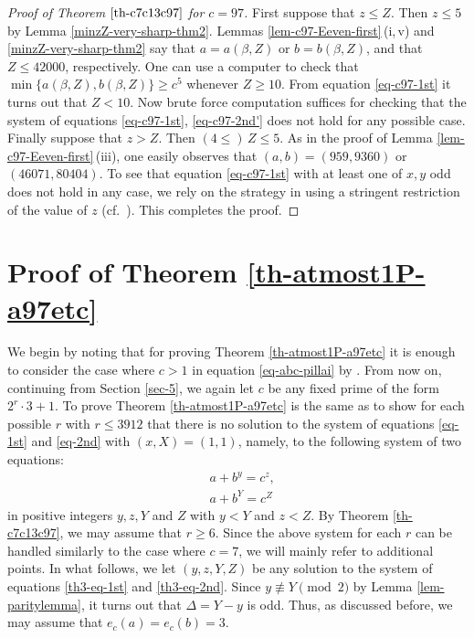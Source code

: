\documentclass[11pt]{amsart}
\numberwithin{equation}{section}
\begin{document}
\begin{proof}[Proof of Theorem $\ref{th-c7c13c97}$ for $c=97$]
First suppose that $z \le Z$.
Then $z \le 5$ by Lemma \ref{minzZ-very-sharp-thm2}.
Lemmas \ref{lem-c97-Eeven-first}\,(i,\,v) and \ref{minzZ-very-sharp-thm2} say that $a=a(\beta,Z)$ or $b=b(\beta,Z)$, and that $Z \le 42000 $, respectively.
One can use a computer to check %
 that $\min\{a(\beta,Z),b(\beta,Z)\} \ge c^{5}$ whenever $Z \ge 10$.
From equation \eqref{eq-c97-1st} it turns out that $Z<10$.
Now brute force computation suffices for checking that the system of equations \eqref{eq-c97-1st}, \eqref{eq-c97-2nd'} does not hold for any possible case.
Finally suppose that $z>Z$.
Then $(4 \le)\,Z \le 5$.
As in the proof of Lemma \ref{lem-c97-Eeven-first}\,(iii), one easily observes that $(a,b)=(959,9360)$ or $(46071,80404)$.
To see that equation \eqref{eq-c97-1st} with at least one of $x,y$ odd does not hold in any case, we rely on the strategy in \cite{St} using a stringent restriction of the value of $z$ (cf.~\cite[Theorem 2]{St}).
This completes the proof.
\end{proof}

\section{Proof of Theorem \ref{th-atmost1P-a97etc}} \label{sec-9}

We begin by noting that for proving Theorem \ref{th-atmost1P-a97etc} it is enough to consider the case where $c>1$ in equation \eqref{eq-abc-pillai} by \cite{LeV}.
From now on, continuing from Section \ref{sec-5}, we again let $c$ be any fixed prime of the form $2^r \cdot 3+1$.
To prove Theorem \ref{th-atmost1P-a97etc} is the same as to show for each possible $r$ with $r \le 3912$ that there is no solution to the system of equations \eqref{eq-1st} and \eqref{eq-2nd} with $(x,X)=(1,1)$, namely, to the following system of two equations:
\begin{eqnarray}
&a+b^y=c^z, \label{th3-eq-1st}\\
&a+b^Y=c^Z \label{th3-eq-2nd}
\end{eqnarray}
in positive integers $y,z,Y$ and $Z$ with $y<Y$ and $z<Z$.
By Theorem \ref{th-c7c13c97}, we may assume that $r \ge 6$.
Since the above system for each $r$ can be handled similarly to the case where $c=7$, we will mainly refer to additional points.
In what follows, we let $(y,z,Y,Z)$ be any solution to the system of equations \eqref{th3-eq-1st} and \eqref{th3-eq-2nd}.
Since $y \not\equiv Y \pmod{2}$ by Lemma \ref{lem-paritylemma}, it turns out that $\Delta=Y-y$ is odd.
Thus, as discussed before, we may assume that $e_{c}(a)=e_{c}(b)=3$.
\end{document}
